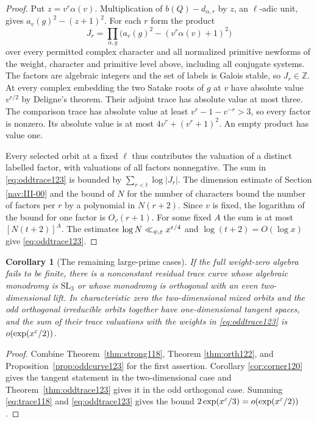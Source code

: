 \documentclass[a4paper,11pt]{article}
\newtheorem{corollary}[proposition]{Corollary}
\theoremstyle{definition}
\theoremstyle{remark}
\newcommand{\ZZ}{\mathbb Z}\newcommand{\ord}{\operatorname{ord}}
\numberwithin{equation}{section}
\begin{document}
\begin{proof}
Put \(z=v^r\alpha(v)\). Multiplication of
\(b(Q)-d_{\alpha,r}\) by \(z\), an \(\ell\)-adic unit, gives
\(a_v(g)^2-(z+1)^2\). For each \(r\) form the product
\[
 J_r=\prod_{\alpha,g}
       \bigl(a_v(g)^2-(v^r\alpha(v)+1)^2\bigr)
\]
over every permitted complex character and all normalized
primitive newforms of the weight, character and primitive
level above, including all conjugate systems. The factors
are algebraic integers and the set of labels is Galois
stable, so \(J_r\in\ZZ\). At every complex embedding the
two Satake roots of \(g\) at \(v\) have absolute value
\(v^{r/2}\) by Deligne's theorem. Their adjoint trace has
absolute value at most three. The comparison trace has
absolute value at least \(v^r-1-v^{-r}>3\), so every factor
is nonzero. Its absolute value is at most
\(4v^r+(v^r+1)^2\). An empty product has value one.

Every selected orbit at a fixed \(\ell\) thus contributes
the valuation of a distinct labelled factor, with valuations
of all factors nonnegative. The sum in \eqref{eq:oddtrace123}
is bounded by \(\sum_{r<t}\log|J_r|\). The dimension estimate
of Section \ref{nav:III-00}
and the bound of \(N\) for the number of characters bound the
number of factors per \(r\) by a polynomial in \(N(r+2)\).
Since \(v\) is fixed, the logarithm of the bound for one
factor is \(O_v(r+1)\). For some fixed \(A\) the sum is at
most \([N(t+2)]^A\). The estimates
\(\log N\ll_{\psi,\varepsilon}x^{\varepsilon/4}\) and
\(\log(t+2)=O(\log x)\) give \eqref{eq:oddtrace123}.
\end{proof}

\begin{corollary}[The remaining large-prime cases]
\label{cor:remain123}
If the full weight-zero algebra fails to be finite, there is
a nonconstant residual trace curve whose algebraic monodromy
is \(\mathrm{SL}_3\) or whose monodromy is orthogonal with
an even two-dimensional lift. In characteristic zero the
two-dimensional mixed orbits and the odd orthogonal irreducible
orbits together have one-dimensional tangent spaces, and the
sum of their trace valuations with the weights in
\eqref{eq:oddtrace123} is \(o(\exp(x^\varepsilon/2))\).
\end{corollary}
\begin{proof}
Combine Theorem~\ref{thm:strong118}, Theorem \ref{thm:orth122},
and Proposition~\ref{prop:oddcurve123} for the first assertion.
Corollary \ref{cor:corner120} gives the tangent statement in the
two-dimensional case and Theorem~\ref{thm:oddtrace123} gives
it in the odd orthogonal case. Summing \eqref{eq:trace118}
and \eqref{eq:oddtrace123} gives the bound
\(2\exp(x^\varepsilon/3)=o(\exp(x^\varepsilon/2))\).
\end{proof}
\end{document}
